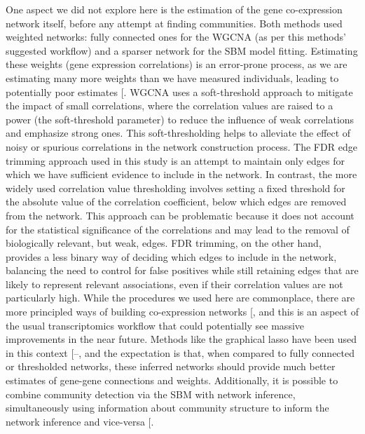 \documentclass[
]{article}
\begin{document}
One aspect we did not explore here is the estimation of the gene
co-expression network itself, before any attempt at finding communities.
Both methods used weighted networks: fully connected ones for the WGCNA
(as per this methods' suggested workflow) and a sparser network for the
SBM model fitting. Estimating these weights (gene expression
correlations) is an error-prone process, as we are estimating many more
weights than we have measured individuals, leading to potentially poor
estimates {[}\citeproc{ref-Schafer2005-ld}{40}{]}. WGCNA uses a
soft-threshold approach to mitigate the impact of small correlations,
where the correlation values are raised to a power (the soft-threshold
parameter) to reduce the influence of weak correlations and emphasize
strong ones. This soft-thresholding helps to alleviate the effect of
noisy or spurious correlations in the network construction process. The
FDR edge trimming approach used in this study is an attempt to maintain
only edges for which we have sufficient evidence to include in the
network. In contrast, the more widely used correlation value
thresholding involves setting a fixed threshold for the absolute value
of the correlation coefficient, below which edges are removed from the
network. This approach can be problematic because it does not account
for the statistical significance of the correlations and may lead to the
removal of biologically relevant, but weak, edges. FDR trimming, on the
other hand, provides a less binary way of deciding which edges to
include in the network, balancing the need to control for false
positives while still retaining edges that are likely to represent
relevant associations, even if their correlation values are not
particularly high. While the procedures we used here are commonplace,
there are more principled ways of building co-expression networks
{[}\citeproc{ref-Peel2022-bq}{41}{]}, and this is an aspect of the usual
transcriptomics workflow that could potentially see massive improvements
in the near future. Methods like the graphical lasso have been used in
this context
{[}--\citeproc{ref-Lyu2018-ac}{44}{]},
and the expectation is that, when compared to fully connected or
thresholded networks, these inferred networks should provide much better
estimates of gene-gene connections and weights. Additionally, it is
possible to combine community detection via the SBM with network
inference, simultaneously using information about community structure to
inform the network inference and vice-versa
{[}\citeproc{ref-Peixoto2019-cj}{45}{]}.
\end{document}
